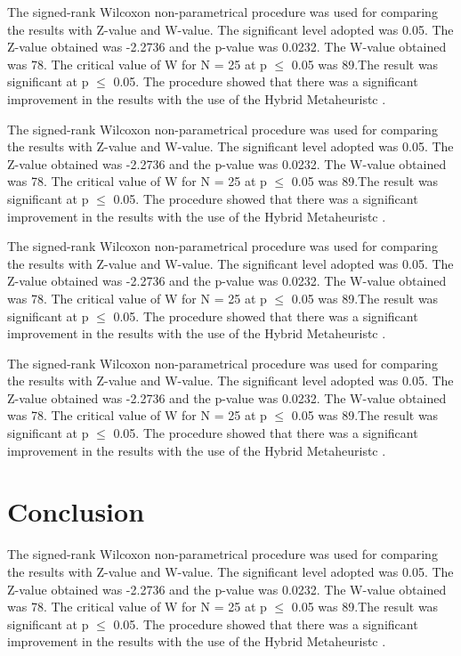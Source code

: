 \documentclass[times]{stvrauth}
\begin{document}
The signed-rank Wilcoxon non-parametrical procedure was used for comparing the results with Z-value and W-value. The significant level adopted was 0.05. The Z-value obtained was -2.2736 and the p-value was 0.0232. The W-value obtained was 78. The critical value of W for N = 25 at p $\leq$ 0.05 was 89.The result was significant at p $\leq$ 0.05. The procedure showed that there was a significant improvement in the results with the use of the Hybrid Metaheuristc .

The signed-rank Wilcoxon non-parametrical procedure was used for comparing the results with Z-value and W-value. The significant level adopted was 0.05. The Z-value obtained was -2.2736 and the p-value was 0.0232. The W-value obtained was 78. The critical value of W for N = 25 at p $\leq$ 0.05 was 89.The result was significant at p $\leq$ 0.05. The procedure showed that there was a significant improvement in the results with the use of the Hybrid Metaheuristc .

The signed-rank Wilcoxon non-parametrical procedure was used for comparing the results with Z-value and W-value. The significant level adopted was 0.05. The Z-value obtained was -2.2736 and the p-value was 0.0232. The W-value obtained was 78. The critical value of W for N = 25 at p $\leq$ 0.05 was 89.The result was significant at p $\leq$ 0.05. The procedure showed that there was a significant improvement in the results with the use of the Hybrid Metaheuristc .

The signed-rank Wilcoxon non-parametrical procedure was used for comparing the results with Z-value and W-value. The significant level adopted was 0.05. The Z-value obtained was -2.2736 and the p-value was 0.0232. The W-value obtained was 78. The critical value of W for N = 25 at p $\leq$ 0.05 was 89.The result was significant at p $\leq$ 0.05. The procedure showed that there was a significant improvement in the results with the use of the Hybrid Metaheuristc .


\section{Conclusion}

The signed-rank Wilcoxon non-parametrical procedure was used for comparing the results with Z-value and W-value. The significant level adopted was 0.05. The Z-value obtained was -2.2736 and the p-value was 0.0232. The W-value obtained was 78. The critical value of W for N = 25 at p $\leq$ 0.05 was 89.The result was significant at p $\leq$ 0.05. The procedure showed that there was a significant improvement in the results with the use of the Hybrid Metaheuristc .
\end{document}
